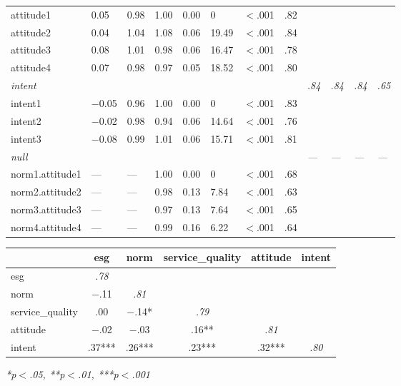\documentclass{article}
\begin{document}
\begin{tabular}{llllllllllll}
\quad attitude1 & 0.05 & 0.98 & 1.00 & 0.00 & 0 & $<$.001 & .82 &  &  &  &  \\
\quad attitude2 & 0.04 & 1.04 & 1.08 & 0.06 & 19.49 & $<$.001 & .84 &  &  &  &  \\
\quad attitude3 & 0.08 & 1.01 & 0.98 & 0.06 & 16.47 & $<$.001 & .78 &  &  &  &  \\
\quad attitude4 & 0.07 & 0.98 & 0.97 & 0.05 & 18.52 & $<$.001 & .80 &  &  &  &  \\
\textit{intent} & \textit{} & \textit{} & \textit{} & \textit{} & \textit{} & \textit{} & \textit{} & \textit{.84} & \textit{.84} & \textit{.84} & \textit{.65} \\
\quad intent1 & $-$0.05 & 0.96 & 1.00 & 0.00 & 0 & $<$.001 & .83 &  &  &  &  \\
\quad intent2 & $-$0.02 & 0.98 & 0.94 & 0.06 & 14.64 & $<$.001 & .76 &  &  &  &  \\
\quad intent3 & $-$0.08 & 0.99 & 1.01 & 0.06 & 15.71 & $<$.001 & .81 &  &  &  &  \\
\textit{null} & \textit{} & \textit{} & \textit{} & \textit{} & \textit{} & \textit{} & \textit{} & \textit{---} & \textit{---} & \textit{---} & \textit{---} \\
\quad norm1.attitude1 & --- & --- & 1.00 & 0.00 & 0 & $<$.001 & .68 &  &  &  &  \\
\quad norm2.attitude2 & --- & --- & 0.98 & 0.13 & 7.84 & $<$.001 & .63 &  &  &  &  \\
\quad norm3.attitude3 & --- & --- & 0.97 & 0.13 & 7.64 & $<$.001 & .65 &  &  &  &  \\
\quad norm4.attitude4 & --- & --- & 0.99 & 0.16 & 6.22 & $<$.001 & .64 &  &  &  &  \\
\bottomrule
\end{tabular}

\begin{tabular}{lccccc}
\toprule
 & esg & norm & service\_quality & attitude & intent \\
\midrule
esg & \textit{.78} &  &  &  &  \\
norm & $-$.11 & \textit{.81} &  &  &  \\
service\_quality & .00 & $-$.14* & \textit{.79} &  &  \\
attitude & $-$.02 & $-$.03 & .16** & \textit{.81} &  \\
intent & .37*** & .26*** & .23*** & .32*** & \textit{.80} \\
\bottomrule
\end{tabular}
\textit{*p$<$.05, **p$<$.01, ***p$<$.001}
\end{document}
